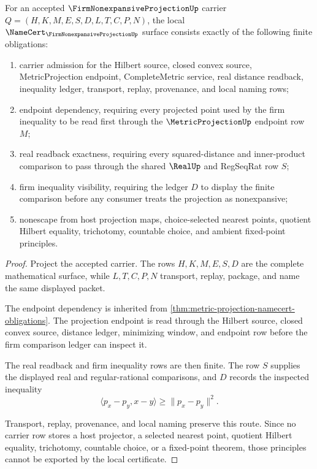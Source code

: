 \begin{theorem}\label{thm:firm-nonexpansive-projection-namecert-obligations}
For an accepted $\FirmNonexpansiveProjectionUp$ carrier $Q=(H,K,M,E,S,D,L,T,C,P,N)$, the local $\NameCert_{\FirmNonexpansiveProjectionUp}$ surface consists exactly of the following finite obligations:
\begin{enumerate}
\item carrier admission for the Hilbert source, closed convex source, MetricProjection endpoint, CompleteMetric service, real distance readback, inequality ledger, transport, replay, provenance, and local naming rows;
\item endpoint dependency, requiring every projected point used by the firm inequality to be read first through the $\MetricProjectionUp$ endpoint row $M$;
\item real readback exactness, requiring every squared-distance and inner-product comparison to pass through the shared $\RealUp$ and RegSeqRat row $S$;
\item firm inequality visibility, requiring the ledger $D$ to display the finite comparison before any consumer treats the projection as nonexpansive;
\item nonescape from host projection maps, choice-selected nearest points, quotient Hilbert equality, trichotomy, countable choice, and ambient fixed-point principles.
\end{enumerate}
\end{theorem}
\begin{proof}
Project the accepted carrier. The rows $H,K,M,E,S,D$ are the complete mathematical surface, while $L,T,C,P,N$ transport, replay, package, and name the same displayed packet.

The endpoint dependency is inherited from \autoref{thm:metric-projection-namecert-obligations}. The projection endpoint is read through the Hilbert source, closed convex source, distance ledger, minimizing window, and endpoint row before the firm comparison ledger can inspect it.

The real readback and firm inequality rows are then finite. The row $S$ supplies the displayed real and regular-rational comparisons, and $D$ records the inspected inequality
$$
\langle p_x-p_y,x-y\rangle \geq \lVert p_x-p_y\rVert^2 .
$$

Transport, replay, provenance, and local naming preserve this route. Since no carrier row stores a host projector, a selected nearest point, quotient Hilbert equality, trichotomy, countable choice, or a fixed-point theorem, those principles cannot be exported by the local certificate.
\end{proof}

